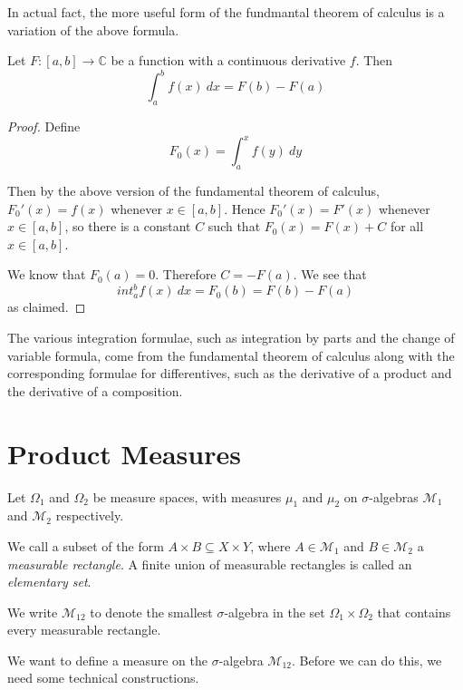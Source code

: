 In actual fact, the more useful form of the fundmantal theorem of calculus is a variation of the above formula.

\begin{corollary}
Let $F\colon [a,b]\rightarrow {\mathbb C}$ be a function with a continuous derivative $f$.  Then
$$\int_a^b f(x)\ dx = F(b)-F(a)$$
\end{corollary}

\begin{proof}
Define
$$F_0 (x) = \int_a^x f(y)\ dy$$

Then by the above version of the fundamental theorem of calculus, $F_0'(x) = f(x)$ whenever $x\in [a,b]$.  Hence $F_0'(x) = F'(x)$ whenever $x\in [a,b]$, so there is a constant $C$ such that $F_0(x) = F(x) +C$ for all $x\in [a,b]$.

We know that $F_0 (a)=0$.  Therefore $C=-F(a)$.  We see that
$$int_a^b f(x)\ dx = F_0 (b) = F(b) - F(a)$$ 
as claimed.
\end{proof}

The various integration formulae, such as integration by parts and the change of variable formula, come from the fundamental theorem of calculus along with the corresponding formulae for differentives, such as the derivative of a product and the derivative of a composition.

\section{Product Measures}

Let $\Omega_1$ and $\Omega_2$ be measure spaces, with measures $\mu_1$ and $\mu_2$ on $\sigma$-algebras ${\mathcal M}_1$ and ${\mathcal M}_2$ respectively.

\begin{definition}
We call a subset of the form $A\times B\subseteq X\times Y$, where $A\in {\mathcal M}_1$ and $B\in {\mathcal M}_2$ a {\em measurable rectangle}.  A finite union of measurable rectangles is called an {\em elementary set}.

We write ${\mathcal M}_{12}$ to denote the smallest $\sigma$-algebra in the set $\Omega_1\times \Omega_2$ that contains every measurable rectangle.
\end{definition}

We want to define a measure on the $\sigma$-algebra ${\mathcal M}_{12}$.  Before we can do this, we need some technical constructions.

